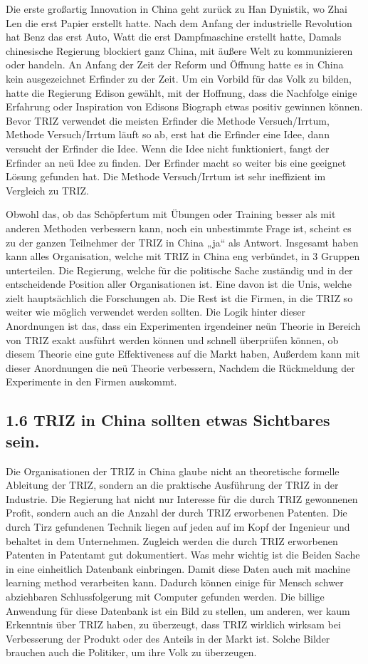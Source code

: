 \documentclass[11pt,a4paper]{article}
\begin{document}
Die erste großartig Innovation in China geht zurück zu Han Dynistik, wo Zhai
Len die erst Papier erstellt hatte. Nach dem Anfang der industrielle
Revolution hat Benz das erst Auto, Watt die erst Dampfmaschine erstellt hatte,
Damals chinesische Regierung blockiert ganz China, mit äußere Welt zu
kommunizieren oder  handeln. An Anfang der Zeit der Reform und Öffnung hatte
es in China kein ausgezeichnet Erfinder zu der Zeit. Um ein Vorbild für das
Volk zu bilden, hatte die Regierung Edison gewählt, mit der Hoffnung, dass die
Nachfolge einige Erfahrung oder Inspiration von Edisons Biograph etwas positiv
gewinnen können. Bevor TRIZ verwendet die meisten Erfinder die Methode
Versuch/Irrtum, Methode Versuch/Irrtum läuft so ab, erst  hat die Erfinder
eine Idee, dann versucht der Erfinder die Idee. Wenn die Idee nicht
funktioniert, fangt der Erfinder an neü Idee zu finden. Der Erfinder macht so
weiter bis eine geeignet Lösung gefunden hat. Die Methode Versuch/Irrtum ist
sehr ineffizient im Vergleich zu TRIZ. 

Obwohl das, ob das Schöpfertum mit Übungen oder Training besser als mit
anderen Methoden verbessern kann, noch ein unbestimmte Frage ist, scheint es
zu der ganzen Teilnehmer der TRIZ in China  „ja“ als Antwort. Insgesamt haben
kann alles Organisation, welche mit TRIZ in China eng verbündet, in 3 Gruppen
unterteilen. Die Regierung, welche für die politische Sache zuständig und in
der entscheidende Position aller Organisationen ist. Eine davon ist die Unis,
welche zielt hauptsächlich die Forschungen ab. Die Rest ist die Firmen, in die
TRIZ so weiter wie möglich verwendet werden sollten. Die Logik hinter dieser
Anordnungen ist das, dass ein Experimenten irgendeiner neün Theorie in
Bereich von TRIZ exakt ausführt werden können und schnell überprüfen können,
ob diesem Theorie eine gute Effektiveness auf die Markt haben, Außerdem kann
mit dieser Anordnungen die neü Theorie verbessern, Nachdem die Rückmeldung
der Experimente in den Firmen auskommt.   

\subsection{1.6 TRIZ in China sollten etwas Sichtbares sein.}

Die Organisationen der TRIZ in China glaube nicht an theoretische formelle
Ableitung der TRIZ, sondern an die praktische Ausführung der TRIZ in der
Industrie. Die Regierung hat nicht nur Interesse für die durch TRIZ
gewonnenen Profit, sondern auch an die Anzahl der  durch TRIZ erworbenen
Patenten. Die durch Tirz gefundenen Technik liegen auf jeden auf im Kopf der
Ingenieur und behaltet in dem Unternehmen. Zugleich werden die durch TRIZ
erworbenen Patenten in Patentamt gut dokumentiert. Was mehr wichtig ist die
Beiden Sache in eine einheitlich Datenbank einbringen. Damit diese Daten auch
mit machine learning method verarbeiten kann. Dadurch können einige für
Mensch schwer abziehbaren Schlussfolgerung mit Computer gefunden  werden. Die
billige Anwendung für diese Datenbank ist ein Bild zu stellen, um anderen, wer
kaum Erkenntnis über  TRIZ haben, zu überzeugt,  dass TRIZ wirklich wirksam
bei Verbesserung der Produkt oder des Anteils in der Markt ist. Solche Bilder
brauchen auch die Politiker, um ihre Volk zu überzeugen.   
\end{document}
